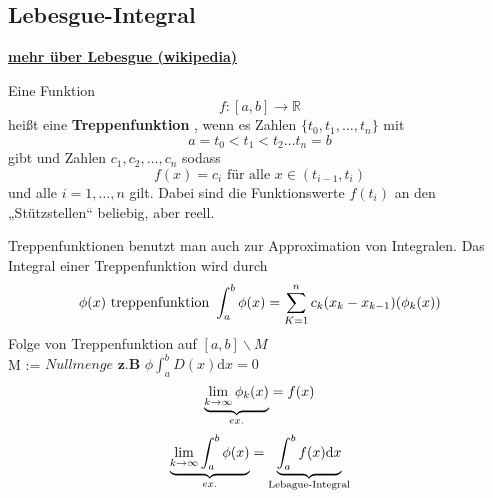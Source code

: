 \subsection{Lebesgue-Integral }
\textbf{\href{https://de.wikipedia.org/wiki/Lebesgue-Integral}{mehr über Lebesgue  (wikipedia)}}
\begin{definition}[Treppenfunktion]
Eine Funktion
\[f:[a,b] \rightarrow \mathbb{R} \]
heißt eine \textbf{Treppenfunktion} , wenn es Zahlen $\{t_0,t_1, \dots , t_n  \}$ mit \[ a = t_0<t_1<t_2 \dots t_n = b \]
gibt und Zahlen $c_1 , c_2 , \dots , c_n$ sodass 
\[ f(x)=c_{i} \text{ für alle } x \in (t_{i-1},t_{i}) \]
und alle $i=1,\dots ,n$  gilt. Dabei sind die Funktionswerte $f(t_{i})$ an den „Stützstellen“ beliebig, aber reell.   
\end{definition}
\begin{remark}
Treppenfunktionen benutzt man auch zur Approximation von Integralen. Das Integral einer Treppenfunktion wird durch
\[ \phi(x) \text{ treppenfunktion } \int_a^b \phi(x) = \sum_{K=1}^{n} c_k (x_k - x_{k-1} ) 
(\phi_k (x)) \]
Folge von Treppenfunktion auf $ [a,b] \backslash M $\\
M := $ Nullmenge \textbf{ z.B } \phi \int_a^b D(x)\mathrm{d}x=0$ \\
\[\underbrace{\lim\limits_{k \rightarrow \infty} \phi_k (x)}_{ex.}= f(x)\]
\[\underbrace{\lim\limits_{k \rightarrow \infty} \int_a^b \phi(x)  }_{ex.}=\underbrace{\int_a^b f(x) \mathrm{d}x }_{\text{Lebague-Integral}} \]
\end{remark}

